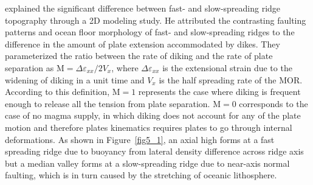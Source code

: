 \documentclass[12pt]{article}
\begin{document}
\citet{Buck2005} explained the significant difference between fast- and slow-spreading ridge topography through a 2D modeling study. He attributed the contrasting faulting patterns and ocean floor morphology of fast- and slow-spreading ridges to the difference in the amount of plate extension accommodated by dikes. They parameterized the ratio between the rate of diking and the rate of plate separation as M$=\Delta\varepsilon_{xx}/2V_{x}$, where $\Delta\varepsilon_{xx}$ is the extensional strain due to the widening of diking in a unit time and $V_{x}$ is the half spreading rate of the MOR. According to this definition, M$=1$ represents the case where diking is frequent enough to release all the tension from plate separation. M$=0$ corresponds to the case of no magma supply, in which diking does not account for any of the plate motion and therefore plates kinematics requires plates to go through internal deformations. As shown in Figure~\ref{fig5_1}, an axial high forms at a fast spreading ridge due to buoyancy from lateral density difference across ridge axis but a median valley forms at a slow-spreading ridge due to near-axis normal faulting, which is in turn caused by the stretching of oceanic lithosphere.

\end{document}
